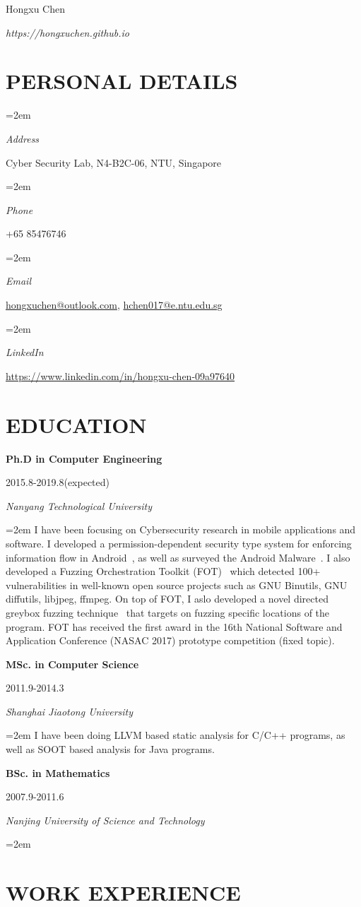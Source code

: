 \documentclass[paper=a4,fontsize=11pt]{article} %
\newlength{\spacebox}
\newcommand{\sepspace}{\vspace*{9pt}}		%
\newcommand{\MyName}[1]{ %
		\Huge \usefont{OT1}{phv}{b}{n} \hfill #1
		\par \normalsize \normalfont}
\newcommand{\MySlogan}[1]{ %
		\large \usefont{OT1}{phv}{m}{n}\hfill \textit{#1}
		\par \normalsize \normalfont}
\newcommand{\NewPart}[1]{\section*{\uppercase{#1}}}
\newcommand{\PersonalEntry}[2]{
		\noindent\hangindent=2em\hangafter=0 %
		\parbox{\spacebox}{        %
		\textit{#1}}		       %
		\hspace{1.5em} #2 \par}    %
\newcommand{\EducationEntry}[4]{
		\noindent \textbf{#1} \hfill      %
			\parbox{12em}{%
			\hfill\color{Black}#2} \par  %
		\noindent \textit{#3} \par        %
		\noindent\hangindent=2em\hangafter=0 \small #4 %
		\normalsize \par}
\begin{document}
\nocite{*}


\MyName{Hongxu Chen}
\MySlogan{{https://hongxuchen.github.io}}


\sepspace

\NewPart{Personal details}{}

\PersonalEntry{Address}{Cyber Security Lab, N4-B2C-06, NTU, Singapore}
\PersonalEntry{Phone}{+65 85476746}
\PersonalEntry{Email}{\url{hongxuchen@outlook.com}, \url{hchen017@e.ntu.edu.sg}}
\PersonalEntry{LinkedIn}{\url{https://www.linkedin.com/in/hongxu-chen-09a97640}}

\NewPart{Education}{}

\EducationEntry{Ph.D in Computer Engineering}{2015.8-2019.8(expected)}{Nanyang Technological University}{
    I have been focusing on Cybersecurity research in mobile applications and software. I developed a permission-dependent security type system for enforcing information flow in Android~\cite{sta}, as well as surveyed the Android Malware~\cite{XueM0TC0Z17}. I also developed a Fuzzing Orchestration Toolkit (FOT)~\cite{fse18-fot} which detected 100+ vulnerabilities in well-known open source projects such as GNU Binutils, GNU diffutils, libjpeg, ffmpeg. On top of FOT, I aslo developed a novel directed greybox fuzzing technique~\cite{hawkeye} that targets on fuzzing specific locations of the program. FOT has received the first award in the 16th National Software and Application Conference (NASAC 2017) prototype competition (fixed topic).
}
\sepspace

\EducationEntry{MSc. in Computer Science}{2011.9-2014.3}{Shanghai Jiaotong University}{
  I have been doing LLVM based static analysis for C/C++ programs, as well as SOOT based analysis for Java programs.}
\sepspace

\EducationEntry{BSc. in Mathematics}{2007.9-2011.6}{Nanjing University of Science and Technology}{}

\NewPart{Work experience}{}
\end{document}
